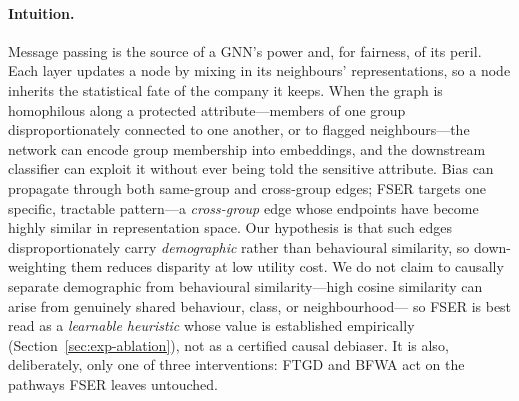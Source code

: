 \documentclass[pdflatex,sn-mathphys-num]{sn-jnl}
\theoremstyle{thmstyleone}%
\theoremstyle{thmstyletwo}%
\theoremstyle{thmstylethree}%
\begin{document}
\paragraph{Intuition.}
Message passing is the source of a GNN's power and, for fairness, of its
peril. Each layer updates a node by mixing in its neighbours' representations,
so a node inherits the statistical fate of the company it keeps. When the graph
is homophilous along a protected attribute---members of one group
disproportionately connected to one another, or to flagged neighbours---the
network can encode group membership into embeddings, and the downstream
classifier can exploit it without ever being told the sensitive attribute. Bias
can propagate through both same-group and cross-group edges; FSER targets one
specific, tractable pattern---a \emph{cross-group} edge whose endpoints have
become highly similar in representation space. Our hypothesis is that such edges
disproportionately carry \emph{demographic} rather than behavioural similarity,
so down-weighting them reduces disparity at low utility cost. We do not claim to
causally separate demographic from behavioural similarity---high cosine
similarity can arise from genuinely shared behaviour, class, or neighbourhood---
so FSER is best read as a \emph{learnable heuristic} whose value is established
empirically (Section~\ref{sec:exp-ablation}), not as a certified causal
debiaser. It is also, deliberately, only one of three interventions: FTGD and
BFWA act on the pathways FSER leaves untouched.
\end{document}
